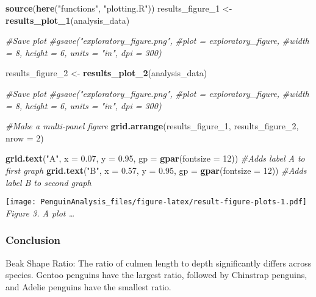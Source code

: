 \documentclass[
]{article}
\newenvironment{Shaded}{\begin{snugshade}}{\end{snugshade}}
\newcommand{\AttributeTok}[1]{\textcolor[rgb]{0.13,0.29,0.53}{#1}}
\newcommand{\CommentTok}[1]{\textcolor[rgb]{0.56,0.35,0.01}{\textit{#1}}}
\newcommand{\DecValTok}[1]{\textcolor[rgb]{0.00,0.00,0.81}{#1}}
\newcommand{\FloatTok}[1]{\textcolor[rgb]{0.00,0.00,0.81}{#1}}
\newcommand{\FunctionTok}[1]{\textcolor[rgb]{0.13,0.29,0.53}{\textbf{#1}}}
\newcommand{\NormalTok}[1]{#1}
\newcommand{\OtherTok}[1]{\textcolor[rgb]{0.56,0.35,0.01}{#1}}
\newcommand{\StringTok}[1]{\textcolor[rgb]{0.31,0.60,0.02}{#1}}
\begin{document}
\begin{Shaded}
\begin{Highlighting}[]
\FunctionTok{source}\NormalTok{(}\FunctionTok{here}\NormalTok{(}\StringTok{"functions"}\NormalTok{, }\StringTok{"plotting.R"}\NormalTok{))}
\NormalTok{results\_figure\_1 }\OtherTok{\textless{}{-}} \FunctionTok{results\_plot\_1}\NormalTok{(analysis\_data)}

\CommentTok{\#Save plot }
\CommentTok{\#gsave("exploratory\_figure.png", }
       \CommentTok{\#plot = exploratory\_figure, }
       \CommentTok{\#width = 8, height = 6, units = "in", dpi = 300)}
       
\NormalTok{results\_figure\_2 }\OtherTok{\textless{}{-}} \FunctionTok{results\_plot\_2}\NormalTok{(analysis\_data)}

\CommentTok{\#Save plot }
\CommentTok{\#gsave("exploratory\_figure.png", }
       \CommentTok{\#plot = exploratory\_figure, }
       \CommentTok{\#width = 8, height = 6, units = "in", dpi = 300)}

\CommentTok{\#Make a multi{-}panel figure}
\FunctionTok{grid.arrange}\NormalTok{(results\_figure\_1,  results\_figure\_2,  }\AttributeTok{nrow =} \DecValTok{2}\NormalTok{)}

\FunctionTok{grid.text}\NormalTok{(}\StringTok{"A"}\NormalTok{, }\AttributeTok{x =} \FloatTok{0.07}\NormalTok{, }\AttributeTok{y =} \FloatTok{0.95}\NormalTok{, }\AttributeTok{gp =} \FunctionTok{gpar}\NormalTok{(}\AttributeTok{fontsize =} \DecValTok{12}\NormalTok{)) }\CommentTok{\#Adds label \textquotesingle{}A\textquotesingle{} to first graph}
\FunctionTok{grid.text}\NormalTok{(}\StringTok{"B"}\NormalTok{, }\AttributeTok{x =} \FloatTok{0.57}\NormalTok{, }\AttributeTok{y =} \FloatTok{0.95}\NormalTok{, }\AttributeTok{gp =} \FunctionTok{gpar}\NormalTok{(}\AttributeTok{fontsize =} \DecValTok{12}\NormalTok{)) }\CommentTok{\#Adds label \textquotesingle{}B\textquotesingle{} to second graph}
\end{Highlighting}
\end{Shaded}

\texttt{[image: PenguinAnalysis\_files/figure-latex/result-figure-plots-1.pdf]}
\emph{Figure 3. A plot \ldots{} }

\subsubsection{Conclusion}\label{conclusion}

Beak Shape Ratio: The ratio of culmen length to depth significantly
differs across species. Gentoo penguins have the largest ratio, followed
by Chinstrap penguins, and Adelie penguins have the smallest ratio.
\end{document}
